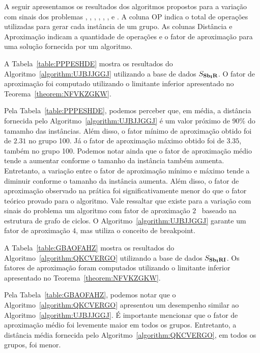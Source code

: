 A seguir apresentamos os resultados dos algoritmos propostos para a variação com sinais dos problemas \SbIR{}, \SbIRI{}, \SbIRM{}, \SbIRMI{}, \SbIRT{}, \SbIRTI{}, \SbIRTM{} e \SbIRTMI{}. A coluna OP indica o total de operações utilizadas para gerar cada instância de um grupo. As colunas Distância e Aproximação indicam a quantidade de operações e o fator de aproximação para uma solução fornecida por um algoritmo.

A Tabela~\ref{table:PPPESHDE} mostra os resultados do Algoritmo~\ref{algorithm:UJBJJGGJ} utilizando a base de dados $S_{\textbf{Sb\textsubscript{I}R}}{}$. O fator de aproximação foi computado utilizando o limitante inferior apresentado no Teorema~\ref{theorem:NFVKZGKW}.



Pela Tabela~\ref{table:PPPESHDE}, podemos perceber que, em média, a distância fornecida pelo Algoritmo~\ref{algorithm:UJBJJGGJ} é um valor próximo de 90\% do tamamho das instâncias. Além disso, o fator mínimo de aproximação obtido foi de $2.31$ no grupo 100. Já o fator de aproximação máximo obtido foi de $3.35$, também no grupo 100. Podemos notar ainda que o fator de aproximação médio tende a aumentar conforme o tamanho da instância também aumenta. Entretanto, a variação entre o fator de aproximação mínimo e máximo tende a diminuir conforme o tamanho da instância aumenta. Além disso, o fator de aproximação observado na prática foi significativamente menor do que o fator teórico provado para o algoritmo. Vale ressaltar que existe para a variação com sinais do problema \SbIR{} um algoritmo com fator de aproximação $2$~\cite{2021b-oliveira-etal} baseado na estrutura de grafo de ciclos. O Algoritmo~\ref{algorithm:UJBJJGGJ} garante um fator de aproximação $4$, mas utiliza o conceito de breakpoint.

A Tabela~\ref{table:GBAOFAHZ} mostra os resultados do Algoritmo~\ref{algorithm:QKCVERGO} utilizando a base de dados $S_{\textbf{Sb\textsubscript{I}RI}}{}$. Os fatores de aproximação foram computados utilizando o limitante inferior apresentado no Teorema~\ref{theorem:NFVKZGKW}.



Pela Tabela~\ref{table:GBAOFAHZ}, podemos notar que o Algoritmo~\ref{algorithm:QKCVERGO} apresentou um desempenho similar ao Algoritmo~\ref{algorithm:UJBJJGGJ}. É importante mencionar que o fator de aproximação médio foi levemente maior em todos os grupos. Entretanto, a distância média fornecida pelo Algoritmo~\ref{algorithm:QKCVERGO}, em todos os grupos, foi menor. 

